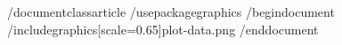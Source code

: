 /documentclass{article}
/usepackage{graphics}
/begin{document}
/includegraphics[scale=0.65]{plot-data.png}
/end{document}
